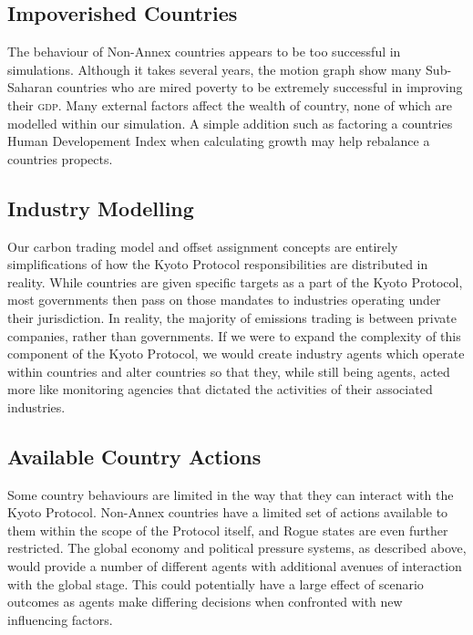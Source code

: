 \subsection{Impoverished Countries}

The behaviour of Non-Annex countries appears to be too successful in simulations.  Although it takes several years, the motion graph show many Sub-Saharan countries who are mired poverty to be extremely successful in improving their \textsc{gdp}. Many external factors affect the wealth of country, none of which are modelled within our simulation.  A simple addition such as factoring a countries Human Developement Index when calculating growth may help rebalance a countries propects.
 
\subsection{Industry Modelling}

Our carbon trading model and offset assignment concepts are entirely simplifications of how the Kyoto Protocol responsibilities are distributed in reality. While countries are given specific targets as a part of the Kyoto Protocol, most governments then pass on those mandates to industries operating under their jurisdiction. In reality, the majority of emissions trading is between private companies, rather than governments. If we were to expand the complexity of this component of the Kyoto Protocol, we would create industry agents which operate within countries and alter countries so that they, while still being agents, acted more like monitoring agencies that dictated the activities of their associated industries.

\subsection{Available Country Actions}

Some country behaviours are limited in the way that they can interact with the Kyoto Protocol. Non-Annex countries have a limited set of actions available to them within the scope of the Protocol itself, and Rogue states are even further restricted. The global economy and political pressure systems, as described above, would provide a number of different agents with additional avenues of interaction with the global stage. This could potentially have a large effect of scenario outcomes as agents make differing decisions when confronted with new influencing factors.

